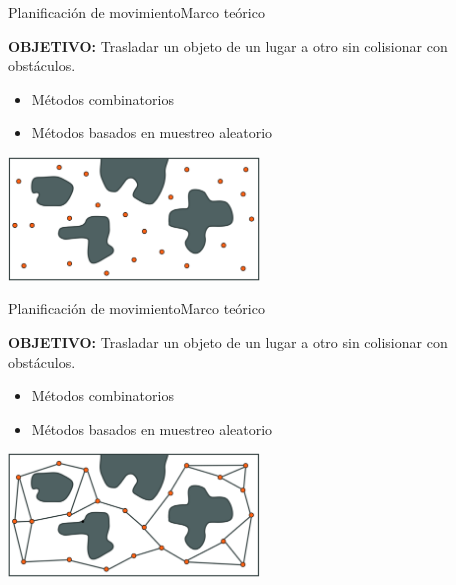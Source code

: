 \documentclass[10pt]{beamer}
\begin{document}
\begin{frame}{Planificación de movimiento}{Marco teórico}\addtocounter{framenumber}{-1}
	\vspace{1.5cm}
	\textbf{OBJETIVO:} Trasladar un objeto de un lugar a otro sin colisionar con obstáculos.
	
	\begin{itemize}
		\item Métodos combinatorios		
		\item Métodos basados en muestreo aleatorio		
	\end{itemize}		
	\begin{center}
		\includegraphics[width=0.5\textwidth,keepaspectratio]{prm_1}
	\end{center}
	
\end{frame}

\begin{frame}{Planificación de movimiento}{Marco teórico}\addtocounter{framenumber}{-1}
	\vspace{1.5cm}
	\textbf{OBJETIVO:} Trasladar un objeto de un lugar a otro sin colisionar con obstáculos.
	\begin{itemize}
		\item Métodos combinatorios		
		\item Métodos basados en muestreo aleatorio		
	\end{itemize}		
	\begin{center}
		\includegraphics[width=0.5\textwidth,keepaspectratio]{prm_2}
	\end{center}
	
\end{frame}
\end{document}
